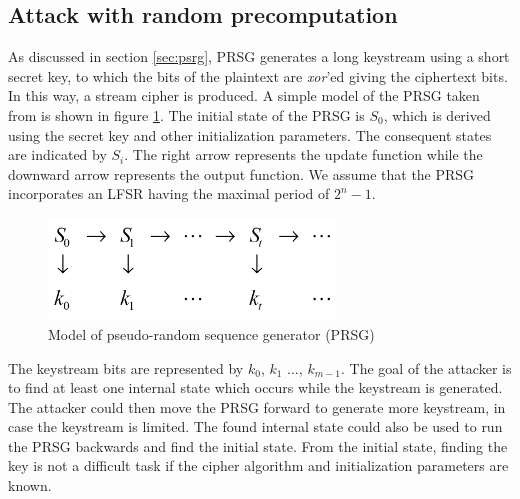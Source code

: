 \subsection{Attack with random precomputation}
\label{sec:bg-r}

As discussed in section \ref{sec:psrg}, PRSG generates a long keystream using a short secret key, to which the bits of the plaintext are \emph{xor}'ed giving the ciphertext bits. In this way, a stream cipher is produced. A simple model of the PRSG taken from \cite{babbage} is shown in figure \ref{fig:psrg-model}. The initial state of the PRSG is $S_0$, which is derived using the secret key and other initialization parameters. The consequent states are indicated by $S_i$. The right arrow represents the update function while the downward arrow represents the output function. We assume that the PRSG incorporates an LFSR having the maximal period of $2^{n} - 1$.

\begin{figure}[h]
	\centering
	\includegraphics[width=3in]{./figures/prsgmodel.png}
	\caption{Model of pseudo-random sequence generator (PRSG)}	
	\label{fig:psrg-model}
\end{figure}

The keystream bits are represented by $k_0$, $k_1$ $\ldots$, $k_{m-1}$. The goal of the attacker is to find at least one internal state which occurs while the keystream is generated. The attacker could then move the PRSG forward to generate more keystream, in case the keystream is limited. The found internal state could also be used to run the PRSG backwards and find the initial state. From the initial state, finding the key is not a difficult task if the cipher algorithm and initialization parameters are known.\\

